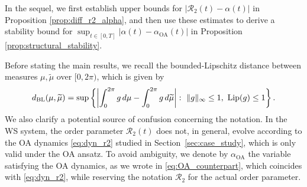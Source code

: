 \documentclass[10pt]{article}
\theoremstyle{definition}
\theoremstyle{definition}
\numberwithin{equation}{section}
\newcommand{\CR}{\mathcal{R}}
\newcommand{\BL}{\mathrm{BL}}
\newcommand{\OA}{\mathrm{OA}}
\begin{document}
In the sequel, we first establish upper bounds for $|\CR_2(t) - \alpha(t)|$ in Proposition \ref{prop:diff_r2_alpha}, and then use these estimates to derive a stability bound for $\sup_{t \in [0,T]} |\alpha(t) - \alpha_{\OA}(t)|$ in Proposition \ref{prop:structural_stability}.

Before stating the main results, we recall the bounded-Lipschitz distance between measures $\mu, \tilde \mu$ over $[0,2\pi)$, which is given by
\begin{equation}\label{eq:BL_metric}
d_{\BL}(\mu,\widetilde{\mu}) = \sup\left\{\left|\int_0^{2\pi}g\, d\mu - \int_0^{2\pi}g\, d\widetilde{\mu} \right|:\ \|g\|_\infty\leq 1,\ {\rm Lip}(g)\leq 1\right\}.
\end{equation}
We also clarify a potential source of confusion concerning the notation.
In the WS system, the order parameter $\CR_2(t)$ does not, in general, evolve according to the OA dynamics \eqref{eq:dyn_r2} studied in Section~\ref{sec:case_study}, which is only valid under the OA ansatz. To avoid ambiguity, we denote by $\alpha_{\OA}$ the variable satisfying the OA dynamics, as we wrote in \eqref{eq:OA_counterpart}, which coincides with \eqref{eq:dyn_r2}, while reserving the notation $\CR_2$ for the actual order parameter.

\end{document}
